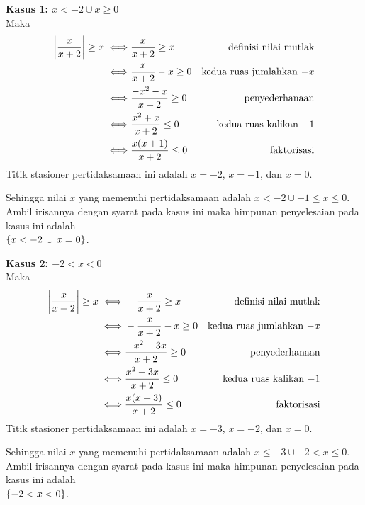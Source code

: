 \begin{enumerate}[leftmargin=*, label={\arabic*}.]
\begin{enumerate}[label={\alph*}.]
    \textbf{Kasus 1: $x < -2 \cup x \geq 0$}\\
    Maka
    \begin{align*}
        \abs*{\frac{x}{x+2}} \geq x
        \iff &\frac{x}{x+2} \geq x
        &\text{definisi nilai mutlak} \\
        \iff &\frac{x}{x+2} -x \geq 0
        &\text{kedua ruas jumlahkan $-x$}\\
        \iff &\frac{-x^{2}-x}{x+2} \geq 0
        &\text{penyederhanaan}\\
        \iff &\frac{x^{2}+x}{x+2} \leq 0
        &\text{kedua ruas kalikan $-1$}\\
        \iff &\frac{x(x+1)}{x+2} \leq 0
        &\text{faktorisasi}\\
    \end{align*}
    Titik stasioner pertidaksamaan ini adalah $x=-2$, $x=-1$, dan $x=0$.

    

    Sehingga nilai $x$ yang memenuhi pertidaksamaan adalah $x < -2 \cup -1 \leq x \leq 0$. Ambil 
    irisannya dengan syarat pada kasus ini maka himpunan penyelesaian pada kasus ini adalah 
    \\$\set{x < -2 \, \cup \, x = 0}$. 

    \textbf{Kasus 2: $-2 < x < 0$}\\
    Maka
    \begin{align*}
        \abs*{\frac{x}{x+2}} \geq x
        \iff &-\frac{x}{x+2} \geq x
        &\text{definisi nilai mutlak} \\
        \iff &-\frac{x}{x+2} -x \geq 0
        &\text{kedua ruas jumlahkan $-x$}\\
        \iff &\frac{-x^{2}-3x}{x+2} \geq 0
        &\text{penyederhanaan}\\
        \iff &\frac{x^{2}+3x}{x+2} \leq 0
        &\text{kedua ruas kalikan $-1$}\\
        \iff &\frac{x(x+3)}{x+2} \leq 0
        &\text{faktorisasi}\\
    \end{align*}
    Titik stasioner pertidaksamaan ini adalah $x=-3$, $x=-2$, dan $x=0$.

    

    Sehingga nilai $x$ yang memenuhi pertidaksamaan adalah $x \leq -3 \cup -2 < x \leq 0$. Ambil 
    irisannya dengan syarat pada kasus ini maka himpunan penyelesaian pada kasus ini adalah 
    \\$\set{-2 < x < 0}$. 


\end{enumerate}
\end{enumerate}
